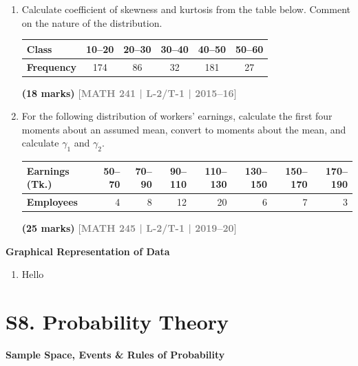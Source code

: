 \documentclass[12pt,a4paper]{article}
\newcommand{\yr}[1]{\hfill\textcolor{gray}{\small\textbf{[#1]}}}
\newcommand{\mk}[1]{\textcolor{orange!70!black}{\small\textbf{(#1 marks)}}}
\newcommand{\subtopic}[2]{%
  \vspace{10pt}
  \noindent\begin{tcolorbox}[colback=#1!8,colframe=#1,boxrule=0.6pt,arc=4pt,
    left=6pt,right=6pt,top=4pt,bottom=4pt]
    \small\bfseries\textcolor{#1}{#2}
  \end{tcolorbox}
  \vspace{2pt}
}
\begin{document}
\begin{enumerate}
\item Calculate coefficient of skewness and kurtosis from the table below. Comment on the nature of the distribution.
\begin{center}
\begin{tabular}{lccccc}
\toprule
\textbf{Class} & 10--20 & 20--30 & 30--40 & 40--50 & 50--60 \\
\midrule
\textbf{Frequency} & 174 & 86 & 32 & 181 & 27 \\
\bottomrule
\end{tabular}
\end{center}
\mk{18} \yr{MATH 241 | L-2/T-1 | 2015--16}

\item For the following distribution of workers' earnings, calculate the first four moments about an assumed mean, convert to moments about the mean, and calculate $\gamma_{1}$ and $\gamma_{2}$.
\begin{center}
\begin{tabular}{lrrrrrrr}
\toprule
\textbf{Earnings (Tk.)} & 50--70 & 70--90 & 90--110 & 110--130 & 130--150 & 150--170 & 170--190 \\
\midrule
\textbf{Employees} & 4 & 8 & 12 & 20 & 6 & 7 & 3 \\
\bottomrule
\end{tabular}
\end{center}
\mk{25} \yr{MATH 245 | L-2/T-1 | 2019--20}


\end{enumerate}

\subtopic{cG}{Graphical Representation of Data}
\label{sub:s7-graphs}

\begin{enumerate}
\item Hello \end{enumerate}


\section{S8. Probability Theory}
\label{sec:S8}

\subtopic{cG}{Sample Space, Events \& Rules of Probability}
\label{sub:s8-basic}
\end{document}
